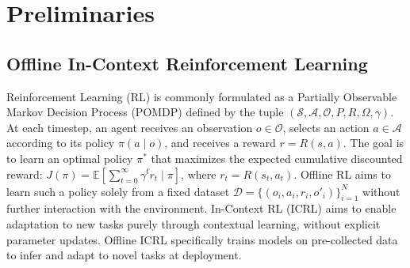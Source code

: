 \documentclass{article} %
\begin{document}


\section{Preliminaries}
\subsection{Offline In-Context Reinforcement Learning}
Reinforcement Learning (RL) is commonly formulated as a Partially Observable Markov Decision Process (POMDP) defined by the tuple $(\mathcal{S}, \mathcal{A}, \mathcal{O}, P, R, \Omega, \gamma)$. At each timestep, an agent receives an observation $o \in \mathcal{O}$, selects an action $a \in \mathcal{A}$ according to its policy $\pi(a \mid o)$, and receives a reward $r = R(s, a)$. The goal is to learn an optimal policy $\pi^*$ that maximizes the expected cumulative discounted reward: $J(\pi) = \mathbb{E} \left[ \sum_{t=0}^{\infty} \gamma^t r_t \mid \pi \right]$, where $r_t = R(s_t, a_t)$. Offline RL \citep{levine2020offline} aims to learn such a policy solely from a fixed dataset $\mathcal{D} = \{(o_i, a_i, r_i, o'_i)\}_{i=1}^{N}$ without further interaction with the environment. In-Context RL (ICRL) \citep{moeini2025survey} aims to enable adaptation to new tasks purely through contextual learning, without explicit parameter updates. Offline ICRL specifically trains models on pre-collected data to infer and adapt to novel tasks at deployment.
\end{document}
